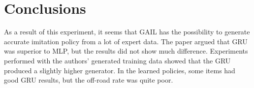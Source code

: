 \chapter{Conclusions}
\label{chapter:conclusions}

As a result of this experiment, it seems that GAIL has the possibility to generate accurate imitation policy from a lot of expert data. The paper argued that GRU was superior to MLP, but the results did not show much difference.
Experiments performed with the authors' generated training data showed that the GRU produced a slightly higher generator. In the learned policies, some items had good GRU results, but the off-road rate was quite poor.

